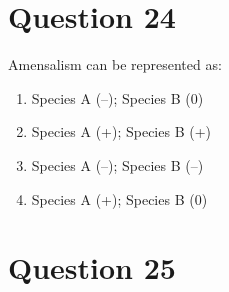 \documentclass{article}
\begin{document}
\section*{Question 24}
Amensalism can be represented as: \newline 
\begin{enumerate}[label=(\alph*)]
\item  Species A (–); Species B (0)
\item  Species A (+); Species B (+)
\item  Species A (–); Species B (–)
\item  Species A (+); Species B (0)
\end{enumerate}
\newpage
\section*{Question 25}
\end{document}
